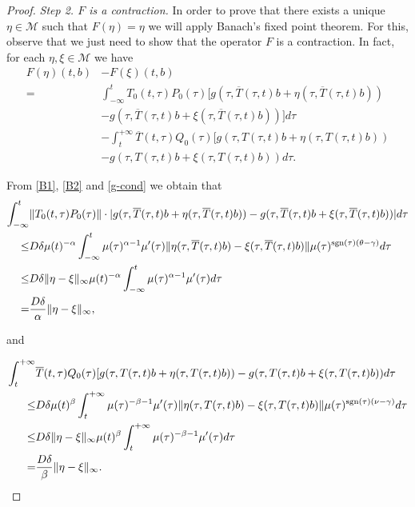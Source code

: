 \documentclass[9pt]{amsart}
\numberwithin{equation}{section}
\numberwithin{lemma}{section}
\begin{document}
\begin{proof}
\textit{Step 2. $F$ is a contraction.} In order to prove that there exists a unique $\eta\in\mathcal{M}$ such that $F(\eta)=\eta$ we will apply Banach's fixed point theorem. For this, observe that we just need to show that the operator $F$ is a contraction. In fact, for each $\eta, \xi\in\mathcal{M}$ we have
\begin{equation*}
        \begin{split}
        F(\eta)(t,b) &- F(\xi)(t,b)\\
        =& \int_{-\infty}^{t}T_0(t,\tau)P_0(\tau)[g(\tau,\overline{T}(\tau,t)b+\eta(\tau,\overline{T}(\tau,t)b))\\
        &- g(\tau,\overline{T}(\tau,t)b+\xi(\tau,\overline{T}(\tau,t)b))]d\tau\\
        &- \int_{t}^{+\infty}\overline{T}(t,\tau)Q_0(\tau)[g(\tau,T(\tau,t)b+\eta(\tau,T(\tau,t)b))\\
        &-g(\tau,T(\tau,t)b+\xi(\tau,T(\tau,t)b))d\tau.
    \end{split}
    \end{equation*}

    From \eqref{B1}, \eqref{B2} and \eqref{g-cond} we obtain that
\begin{equation*}
    \begin{split}
        \int_{-\infty}^{t}&\|T_0(t,\tau)P_0(\tau)\|\cdot|g(\tau,\overline{T}(\tau,t)b+\eta(\tau,\overline{T}(\tau,t)b))- g(\tau,\overline{T}(\tau,t)b+\xi(\tau,\overline{T}(\tau,t)b))|d\tau\\
        \leq & D\delta\mu(t)^{-\alpha}\int_{-\infty}^{t}\mu(\tau)^{\alpha-1}\mu'(\tau)\|\eta(\tau,\overline{T}(\tau,t)b) - \xi(\tau,\overline{T}(\tau,t)b)\|\mu(\tau)^{\textnormal{sgn}(\tau)(\theta-\gamma)}d\tau\\
        \leq & D\delta\|\eta-\xi\|_{\infty}\mu(t)^{-\alpha}\int_{-\infty}^{t}\mu(\tau)^{\alpha-1}\mu'(\tau)d\tau\\
        =& \frac{D\delta}{\alpha}\|\eta-\xi\|_{\infty},
    \end{split}
\end{equation*}

and

\begin{equation*}
    \begin{split}
        \int_{t}^{+\infty}&\overline{T}(t,\tau)Q_0(\tau)[g(\tau,T(\tau,t)b+\eta(\tau,T(\tau,t)b))
        -g(\tau,T(\tau,t)b+\xi(\tau,T(\tau,t)b))d\tau\\
        \leq & D\delta\mu(t)^{\beta}\int_{t}^{+\infty}\mu(\tau)^{-\beta-1}\mu'(\tau)\|\eta(\tau,T(\tau,t)b) - \xi(\tau,T(\tau,t)b)\|\mu(\tau)^{\textnormal{sgn}(\tau)(\nu-\gamma)}d\tau\\
        \leq & D\delta\|\eta-\xi\|_{\infty}\mu(t)^{\beta}\int_{t}^{+\infty}\mu(\tau)^{-\beta-1}\mu'(\tau)d\tau\\
        =& \frac{D\delta}{\beta}\|\eta-\xi\|_{\infty}.
    \end{split}
\end{equation*}


\end{proof}
\end{document}
